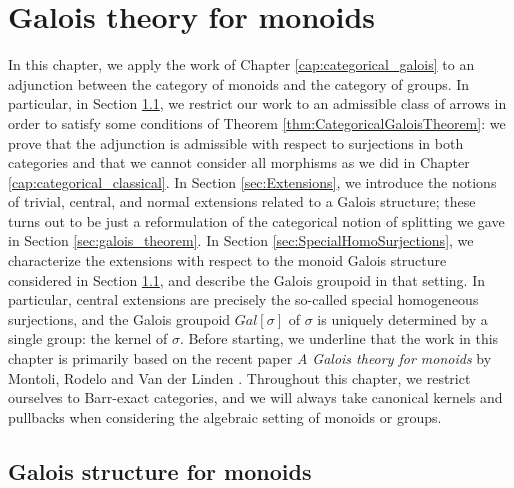 \chapter{Galois theory for monoids}
\label{cap:GaloisMonoids}

In this chapter, we apply the work of Chapter \ref{cap:categorical_galois} to an adjunction between the category of monoids and the category of groups. In particular, in Section \ref{sec:GaloisStructureMonoids}, we restrict our work to an admissible class of arrows in order to satisfy some conditions of Theorem \ref{thm:CategoricalGaloisTheorem}: we prove that the adjunction is admissible with respect to surjections in both categories and that we cannot consider all morphisms as we did in Chapter \ref{cap:categorical_classical}. In Section \ref{sec:Extensions}, we introduce the notions of trivial, central, and normal extensions related to a Galois structure; these turns out to be just a reformulation of the categorical notion of splitting we gave in Section \ref{sec:galois_theorem}. In Section \ref{sec:SpecialHomoSurjections}, we characterize the extensions with respect to the monoid Galois structure considered in Section \ref{sec:GaloisStructureMonoids}, and describe the Galois groupoid in that setting. In particular, central extensions are precisely the so-called special homogeneous surjections, and the Galois groupoid $Gal[\sigma]$ of $\sigma$ is uniquely determined by a single group: the kernel of $\sigma$. Before starting, we underline that the work in this chapter is primarily based on the recent paper \textit{A Galois theory for monoids} by Montoli, Rodelo and Van der Linden \cite{montoli2014galois}. Throughout this chapter, we restrict ourselves to Barr-exact categories, and we will always take canonical kernels and pullbacks when considering the algebraic setting of monoids or groups.

\section{Galois structure for monoids}
\label{sec:GaloisStructureMonoids}

